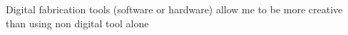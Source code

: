 Digital fabrication tools (software or hardware) allow me to be more creative than using non digital tool alone